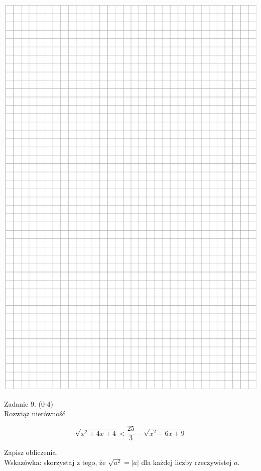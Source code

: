 \documentclass[10pt]{article}
\begin{document}
\includegraphics[max width=\textwidth, center]{2024_11_21_f1ecc00f5c4ab21f0d04g-13}

Zadanie 9. (0-4)\\
Rozwiąż nierówność

\[
\sqrt{x^{2}+4 x+4}<\frac{25}{3}-\sqrt{x^{2}-6 x+9}
\]

Zapisz obliczenia.\\
Wskazówka: skorzystaj z tego, że \(\sqrt{a^{2}}=|a|\) dla każdej liczby rzeczywistej \(a\).
\end{document}
